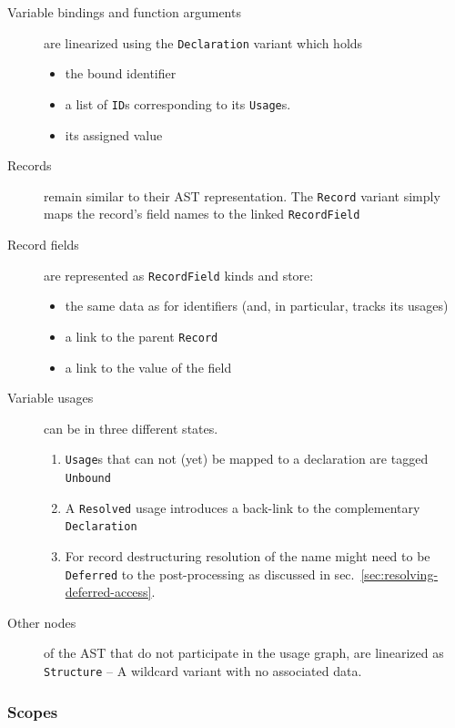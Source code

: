 \documentclass[
  a4paper,
  bibtex,
  english,
  nomenclature]{kthlatex/kththesis/kththesis}
\providecommand{\tightlist}{%
  \setlength{\itemsep}{0pt}\setlength{\parskip}{0pt}}
\begin{document}
\begin{description}
\item[Variable bindings and function arguments]
are linearized using the \texttt{Declaration} variant which holds

\begin{itemize}
\tightlist
\item
  the bound identifier
\item
  a list of \texttt{ID}s corresponding to its \texttt{Usage}s.
\item
  its assigned value
\end{itemize}
\item[Records]
remain similar to their AST representation. The \texttt{Record} variant
simply maps the record's field names to the linked \texttt{RecordField}
\item[Record fields]
are represented as \texttt{RecordField} kinds and store:

\begin{itemize}
\tightlist
\item
  the same data as for identifiers (and, in particular, tracks its
  usages)
\item
  a link to the parent \texttt{Record}
\item
  a link to the value of the field
\end{itemize}
\item[Variable usages]
can be in three different states.

\begin{enumerate}
\def\labelenumi{\arabic{enumi}.}
\tightlist
\item
  \texttt{Usage}s that can not (yet) be mapped to a declaration are
  tagged \texttt{Unbound}
\item
  A \texttt{Resolved} usage introduces a back-link to the complementary
  \texttt{Declaration}
\item
  For record destructuring resolution of the name might need to be
  \texttt{Deferred} to the post-processing as discussed in
  sec.~\ref{sec:resolving-deferred-access}.
\end{enumerate}
\item[Other nodes]
of the AST that do not participate in the usage graph, are linearized as
\texttt{Structure} -- A wildcard variant with no associated data.
\end{description}

\hypertarget{sec:scopes}{%
\subsubsection{Scopes}\label{sec:scopes}}
\end{document}
